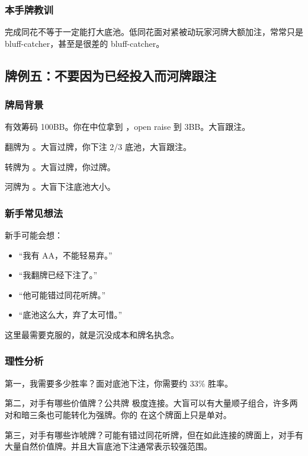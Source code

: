 \subsubsection*{本手牌教训}

完成同花不等于一定能打大底池。低同花面对紧被动玩家河牌大额加注，常常只是 bluff-catcher，甚至是很差的 bluff-catcher。

\subsection{牌例五：不要因为已经投入而河牌跟注}

\subsubsection*{牌局背景}

有效筹码 100BB。你在中位拿到 ，open raise 到 3BB。大盲跟注。

翻牌为 。大盲过牌，你下注 2/3 底池，大盲跟注。

转牌为 。大盲过牌，你过牌。

河牌为 。大盲下注底池大小。

\subsubsection*{新手常见想法}

新手可能会想：

\begin{itemize}
\item “我有 AA，不能轻易弃。”
\item “我翻牌已经下注了。”
\item “他可能错过同花听牌。”
\item “底池这么大，弃了太可惜。”
\end{itemize}

这里最需要克服的，就是沉没成本和牌名执念。

\subsubsection*{理性分析}

第一，我需要多少胜率？面对底池下注，你需要约 33\% 胜率。

第二，对手有哪些价值牌？公共牌  极度连接。大盲可以有大量顺子组合，许多两对和暗三条也可能转化为强牌。你的  在这个牌面上只是单对。

第三，对手有哪些诈唬牌？可能有错过同花听牌，但在如此连接的牌面上，对手有大量自然价值牌。并且大盲底池下注通常表示较强范围。

